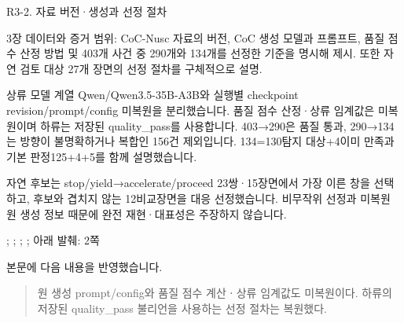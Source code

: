 \clearpage

\begin{reviewitem}{R3-2. 자료 버전·생성과 선정 절차}

\begin{reviewercomment}

3장 데이터와 증거 범위: CoC-Nusc 자료의 버전, CoC 생성 모델과 프롬프트, 품질 점수 산정 방법 및 403개 사건 중 290개와 134개를 선정한 기준을 명시해 제시. 또한 자연 검토 대상 27개 장면의 선정 절차를 구체적으로 설명.

\end{reviewercomment}

\begin{authorresponse}

상류 모델 계열 Qwen/Qwen3.5-35B-A3B와 실행별 checkpoint revision/prompt/config 미복원을 분리했습니다. 품질 점수 산정·상류 임계값은 미복원이며 하류는 저장된 quality\_pass를 사용합니다. 403→290은 품질 통과, 290→134는 방향이 불명확하거나 복합인 156건 제외입니다. 134=130탐지 대상+4이미 만족과 기본 판정125+4+5를 함께 설명했습니다.

자연 후보는 stop/yield→accelerate/proceed 23쌍·15장면에서 가장 이른 창을 선택하고, 후보와 겹치지 않는 12비교장면을 대응 선정했습니다. 비무작위 선정과 미복원 원 생성 정보 때문에 완전 재현·대표성은 주장하지 않습니다.

\end{authorresponse}

\begin{manuscriptrevision}{; ; ; ; 아래 발췌: 2쪽}

본문에 다음 내용을 반영했습니다.

\begin{quote}

원 생성 prompt/config와 품질 점수 계산ㆍ상류 임계값도 미복원이다. 하류의 저장된 quality\_pass 불리언을 사용하는 선정 절차는 복원했다.

\end{quote}

\end{manuscriptrevision}

\end{reviewitem}

\clearpage

